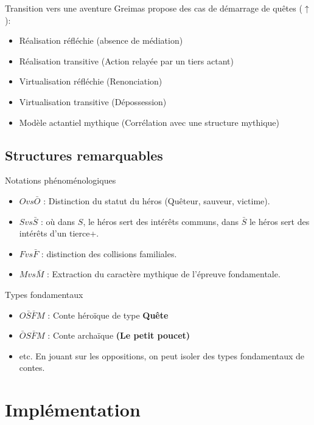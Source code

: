 \documentclass{beamer}
\begin{document}
\begin{frame}{Transition vers une aventure}
  Greimas propose des cas de démarrage de quêtes ($\uparrow$):
  \begin{itemize}
    \item Réalisation réfléchie (absence de médiation)
    \item Réalisation transitive (Action relayée par un tiers actant)
    \item Virtualisation réfléchie (Renonciation)
    \item Virtualisation transitive (Dépossession)
    \item Modèle actantiel mythique (Corrélation avec une structure mythique)
  \end{itemize}
\end{frame}

\subsection{Structures remarquables}
\begin{frame}{Notations phénoménologiques}
  \begin{itemize}
    \item $O vs \bar{O}$ : Distinction du statut du héros (Quêteur, sauveur, victime).
    \item $S vs \bar{S}$ : où dans $S$, le héros sert des intérêts communs, dans $\bar{S}$ le héros sert des intérêts d'un tierce+.
    \item $F vs \bar{F}$ : distinction des collisions familiales.
    \item $M vs \bar{M}$ : Extraction du caractère mythique de l'épreuve fondamentale.
  \end{itemize}
\end{frame}

\begin{frame}{Types fondamentaux}
  \begin{itemize}
    \item $O\bar{S}\bar{F}M$ : Conte héroïque de type \textbf{Quête}
    \item $\bar{O}S\bar{F}M$ : Conte archaïque \textbf{(Le petit poucet)}
    \item etc. En jouant sur les oppositions, on peut isoler des types fondamentaux de contes.
  \end{itemize}
\end{frame}

\section{Implémentation}
\end{document}
